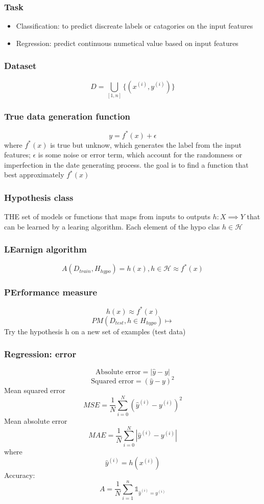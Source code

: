 \documentclass{article}
\begin{document}
\subsubsection*{Task}
\begin{itemize}
    \item Classification: to predict discreate labels or catagories on the input features
    \item Regression: predict continuous numetical value based on input features
\end{itemize}
\subsubsection*{Dataset}
\[D = \bigcup_{[1, n]}\{ (x^{(i)}, y^{(i)})\}\]
\subsubsection*{True data generation function}
\[y = f^*(x) + \epsilon\]
where $f^*(x)$ is true but unknow, which generates the label from the input features; $\epsilon$ is some noise or error term, which account for the randomness or imperfection in the date generating process. \newline
the goal is to find a function that best approximately $f^*(x)$
\subsubsection*{Hypothesis class}
THE set of models or functions that maps from inputs to outputs $h:X \implies Y$ that can be learned by a learing algorithm. 
Each element of the hypo clas $h \in \mathcal{H}$ 
\subsubsection*{LEarnign algorithm }
\[A(D_{train}, H_{hypo}) = h(x),  h\in \mathcal{H} \approx f^*(x)\]
\subsubsection*{PErformance measure}
\[h(x) \approx f^*(x)\]
\[PM(D_{test}, h \in H_{hypo}) \mapsto \]
Try the hypothesis h on a new set of examples (test data)\\

\subsubsection*{Regression: error}
\begin{equation}
    \text{Absolute error} = |\hat{y} - y|
\end{equation}
\begin{equation}
    \text{Squared error} = (\hat{y} - y)^2 
\end{equation}
Mean squared error
\[MSE = \frac{1}{N} \sum_{i=0}^{N}(\hat{y}^{(i)} - y^{(i)})^2 \]
Mean absolute error
\[MAE = \frac{1}{N} \sum_{i=0}^{N}|\hat{y}^{(i)} - y^{(i)}| \]
where 
\[\hat{y}^{(i)} = h(x^{(i)})\]
Accuracy: 
\[A = \frac{1}{N} \sum_{i=1}^{n} \mathds{1}_{\hat{y}^{(i)} = y^{(i)}}\]
\end{document}
